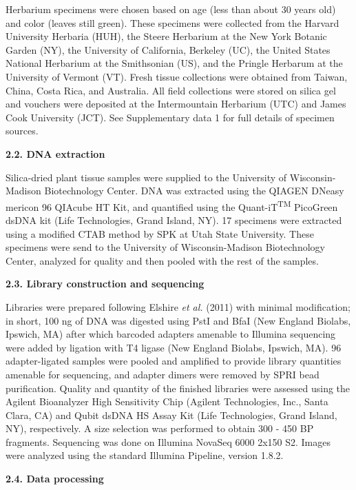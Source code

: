 \documentclass[12pt]{article}
\begin{document}
\begin{flushleft}
Herbarium specimens were chosen based on age (less than about 30 years old) and color (leaves still green). These specimens were collected from the Harvard University Herbaria (HUH), the Steere Herbarium at the New York Botanic Garden (NY), the University of California, Berkeley (UC), the United States National Herbarium at the Smithsonian (US), and the Pringle Herbarum at the University of Vermont (VT). Fresh tissue collections were obtained from Taiwan, China, Costa Rica, and Australia. All field collections were stored on silica gel and vouchers were deposited at the Intermountain Herbarium (UTC) and James Cook University (JCT). See Supplementary data 1 for full details of specimen sources.

\textbf{2.2. DNA extraction}

Silica-dried plant tissue samples were supplied to the University of Wisconsin-Madison Biotechnology Center. DNA was extracted using the QIAGEN DNeasy mericon 96 QIAcube HT Kit, and quantified using the Quant-iT\textsuperscript{TM} PicoGreen\textsuperscript{\textregistered} dsDNA kit (Life Technologies, Grand Island, NY). 17 specimens were extracted using a modified CTAB method \autocite{Doyle1987} by SPK at Utah State University. These specimens were send to the University of Wisconsin-Madison Biotechnology Center, analyzed for quality and then pooled with the rest of the samples.

\textbf{2.3. Library construction and sequencing}

Libraries were prepared following Elshire \textit{et al.} (2011)\nocite{Elshire2011} with minimal modification; in short, 100 ng of DNA was digested using PstI and BfaI (New England Biolabs, Ipswich, MA) after which barcoded adapters amenable to Illumina sequencing were added by ligation with T4 ligase (New England Biolabs, Ipswich, MA). 96 adapter-ligated samples were pooled and amplified to provide library quantities amenable for sequencing, and adapter dimers were removed by SPRI bead purification. Quality and quantity of the finished libraries were assessed using the Agilent Bioanalyzer High Sensitivity Chip (Agilent Technologies, Inc., Santa Clara, CA) and Qubit\textsuperscript{\textregistered} dsDNA HS Assay Kit (Life Technologies, Grand Island, NY), respectively. A size selection was performed to obtain 300 - 450 BP fragments. Sequencing was done on Illumina NovaSeq 6000 2x150 S2. Images were analyzed using the standard Illumina Pipeline, version 1.8.2. 

\textbf{2.4. Data processing}


\end{flushleft}
\end{document}
